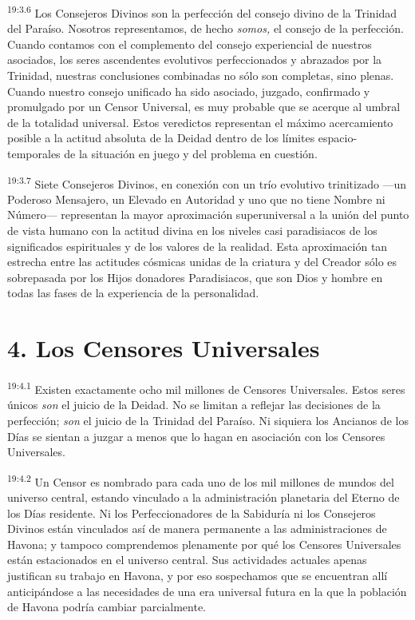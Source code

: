 \par
\textsuperscript{19:3.6} Los Consejeros Divinos son la perfección del consejo divino de la Trinidad del Paraíso. Nosotros representamos, de hecho \textit{somos,} el consejo de la perfección. Cuando contamos con el complemento del consejo experiencial de nuestros asociados, los seres ascendentes evolutivos perfeccionados y abrazados por la Trinidad, nuestras conclusiones combinadas no sólo son completas, sino plenas. Cuando nuestro consejo unificado ha sido asociado, juzgado, confirmado y promulgado por un Censor Universal, es muy probable que se acerque al umbral de la totalidad universal. Estos veredictos representan el máximo acercamiento posible a la actitud absoluta de la Deidad dentro de los límites espacio-temporales de la situación en juego y del problema en cuestión.

\par
\textsuperscript{19:3.7} Siete Consejeros Divinos, en conexión con un trío evolutivo trinitizado ---un Poderoso Mensajero, un Elevado en Autoridad y uno que no tiene Nombre ni Número--- representan la mayor aproximación superuniversal a la unión del punto de vista humano con la actitud divina en los niveles casi paradisiacos de los significados espirituales y de los valores de la realidad. Esta aproximación tan estrecha entre las actitudes cósmicas unidas de la criatura y del Creador sólo es sobrepasada por los Hijos donadores Paradisiacos, que son Dios y hombre en todas las fases de la experiencia de la personalidad.

\section*{4. Los Censores Universales}
\par
\textsuperscript{19:4.1} Existen exactamente ocho mil millones de Censores Universales. Estos seres únicos \textit{son} el juicio de la Deidad. No se limitan a reflejar las decisiones de la perfección; \textit{son} el juicio de la Trinidad del Paraíso. Ni siquiera los Ancianos de los Días se sientan a juzgar a menos que lo hagan en asociación con los Censores Universales.

\par
\textsuperscript{19:4.2} Un Censor es nombrado para cada uno de los mil millones de mundos del universo central, estando vinculado a la administración planetaria del Eterno de los Días residente. Ni los Perfeccionadores de la Sabiduría ni los Consejeros Divinos están vinculados así de manera permanente a las administraciones de Havona; y tampoco comprendemos plenamente por qué los Censores Universales están estacionados en el universo central. Sus actividades actuales apenas justifican su trabajo en Havona, y por eso sospechamos que se encuentran allí anticipándose a las necesidades de una era universal futura en la que la población de Havona podría cambiar parcialmente.

